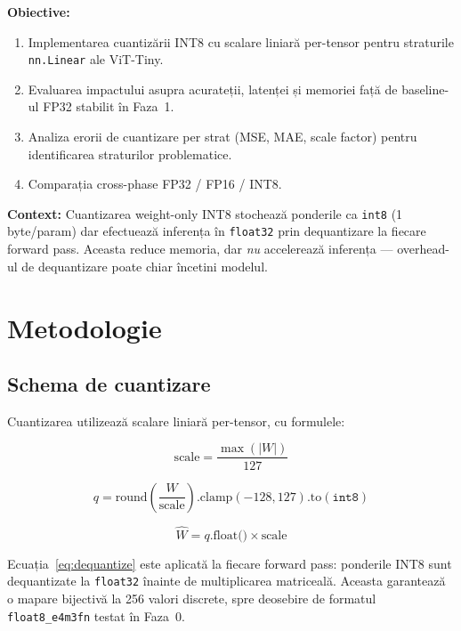 \documentclass[12pt,a4paper]{article}
\begin{document}
\textbf{Obiective:}
\begin{enumerate}
  \item Implementarea cuantizării INT8 cu scalare liniară per-tensor
    pentru straturile \texttt{nn.Linear} ale ViT-Tiny.
  \item Evaluarea impactului asupra acurateții, latenței și memoriei
    față de baseline-ul FP32 stabilit în Faza~1.
  \item Analiza erorii de cuantizare per strat (MSE, MAE, scale factor)
    pentru identificarea straturilor problematice.
  \item Comparația cross-phase FP32 / FP16 / INT8.
\end{enumerate}

\textbf{Context:} Cuantizarea weight-only INT8 stochează ponderile ca
\texttt{int8} (1 byte/param) dar efectuează inferența în \texttt{float32}
prin dequantizare la fiecare forward pass. Aceasta reduce memoria, dar
\emph{nu} accelerează inferența --- overhead-ul de dequantizare poate chiar
încetini modelul.

\section{Metodologie}

\subsection{Schema de cuantizare}

Cuantizarea utilizează scalare liniară per-tensor, cu formulele:

\begin{equation}
  \text{scale} = \frac{\max(|W|)}{127}
  \label{eq:scale}
\end{equation}

\begin{equation}
  q = \text{round}\!\left(\frac{W}{\text{scale}}\right)
    .\text{clamp}(-128, 127).\text{to}(\texttt{int8})
  \label{eq:quantize}
\end{equation}

\begin{equation}
  \hat{W} = q.\text{float()} \times \text{scale}
  \label{eq:dequantize}
\end{equation}

Ecuația~\eqref{eq:dequantize} este aplicată la fiecare forward pass:
ponderile INT8 sunt dequantizate la \texttt{float32} înainte de multiplicarea
matriceală. Aceasta garantează o mapare bijectivă la 256 valori discrete,
spre deosebire de formatul \texttt{float8\_e4m3fn} testat în Faza~0.
\end{document}
